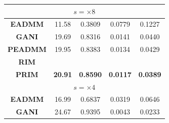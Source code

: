 \documentclass[conference]{IEEEtran}
\begin{document}
\begin{table}[b!]
\begin{tabular}{|ccccc|}
\multicolumn{5}{|c|}{\textbf{$s = \times 8$}}                                                                                                                                                                                                                               \\ \hline
\multicolumn{1}{|c|}{\textbf{EADMM}}                          & \multicolumn{1}{c|}{11.58}                                  & \multicolumn{1}{c|}{0.3809}                                  & \multicolumn{1}{c|}{0.0779}                                  & 0.1227          \\ \hline
\multicolumn{1}{|c|}{\textbf{GANI}}                           & \multicolumn{1}{c|}{19.69}                                  & \multicolumn{1}{c|}{0.8316}                                  & \multicolumn{1}{c|}{0.0141}                                  & 0.0440          \\ \hline
\multicolumn{1}{|c|}{\textbf{PEADMM}} & \multicolumn{1}{c|}{19.95}          & \multicolumn{1}{c|}{0.8383}          & \multicolumn{1}{c|}{0.0134}          & 0.0429          \\ \hline
\multicolumn{1}{|c|}{\textbf{RIM}}    & \multicolumn{1}{c|}{\cellcolor[HTML]{DDEBF7}{\ul 20.49}}          & \multicolumn{1}{c|}{\cellcolor[HTML]{DDEBF7}{\ul 0.8497}}          & \multicolumn{1}{c|}{\cellcolor[HTML]{DDEBF7}{\ul 0.0122}}          & \cellcolor[HTML]{DDEBF7}{\ul 0.0417}          \\ \hline
\multicolumn{1}{|c|}{\textbf{PRIM}}   & \multicolumn{1}{c|}{\cellcolor[HTML]{E2EFDA}\textbf{20.91}} & \multicolumn{1}{c|}{\cellcolor[HTML]{E2EFDA}\textbf{0.8590}} & \multicolumn{1}{c|}{\cellcolor[HTML]{E2EFDA}\textbf{0.0117}} & \cellcolor[HTML]{E2EFDA}\textbf{0.0389} \\ \hline
\multicolumn{5}{|c|}{\textbf{$s = \times 4$}}                                                                                                                                                                                                                               \\ \hline
\multicolumn{1}{|c|}{\textbf{EADMM}}                          & \multicolumn{1}{c|}{16.99}                                  & \multicolumn{1}{c|}{0.6837}                                  & \multicolumn{1}{c|}{0.0319}                                  & 0.0646          \\ \hline
\multicolumn{1}{|c|}{\textbf{GANI}}                           & \multicolumn{1}{c|}{24.67}                                  & \multicolumn{1}{c|}{0.9395}                                  & \multicolumn{1}{c|}{0.0043}                                  & 0.0233          \\ \hline

\end{tabular}
\end{table}
\end{document}
